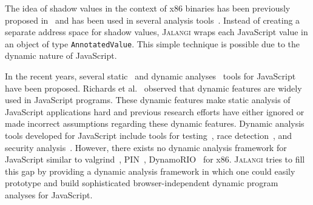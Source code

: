 \documentclass{sig-alternate}
\def\jalangi{\textsc{Jalangi}}
\begin{document}
The idea of shadow values in the context of x86 binaries has been
previously proposed
in~\cite{Nethercote:2007:VFH:1250734.1250746,Zhao:2010:1772954.1772960}
and has been used in several analysis
tools~\cite{Zhao:2010:1772954.1772960,songndss05,Bond:2007:TBA:1297027.1297057,hobbs}.
Instead of creating a separate address space for shadow values,
\jalangi{} wraps each JavaScript value in an object of type
\texttt{AnnotatedValue}.  This simple technique is possible due to the
dynamic nature of JavaScript.

In the recent years, several
static~\cite{Yu:2007:JIB:1190216.1190252,Jensen:2010:IAL:1882094.1882114,Anderson:2005:TTI:2144892.2144917,manuicse13,Wei:2012:BAJ:2384716.2384758,Sridharan:2012:CTP:2367163.2367191}
and dynamic
analyses~\cite{Petrov:2012:RDW:2254064.2254095,Richards:2010:ADB:1806596.1806598,Artzi:2011:FAT:1985793.1985871,Mesbah:2009:IAT:1555001.1555037}
tools for JavaScript have been proposed.  Richards et
al.~\cite{Richards:2010:ADB:1806596.1806598} observed that dynamic
features are widely used in JavaScript programs.  These dynamic
features make static analysis of JavaScript applications hard and
previous research efforts have either ignored or made incorrect
assumptions regarding these dynamic features.  Dynamic analysis tools
developed for JavaScript include tools for
testing~\cite{Artzi:2011:FAT:1985793.1985871,Saxena:2010:SEF:1849417.1849985},
race detection~\cite{Petrov:2012:RDW:2254064.2254095}, and security
analysis~\cite{Vikram:2009:RAS:1653662.1653685}.  However, there
exists no dynamic analysis framework for JavaScript similar to
valgrind~\cite{Nethercote:2007:VFH:1250734.1250746},
PIN~\cite{Luk:2005:PBC:1065010.1065034},
DynamoRIO~\cite{Bruening:2003:IAD:776261.776290} for x86.  \jalangi{}
tries to fill this gap by providing a dynamic analysis framework in
which one could easily prototype and build sophisticated
browser-independent dynamic program analyses for JavaScript.
\end{document}
